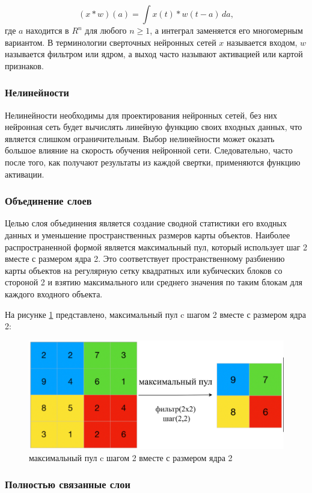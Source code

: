 \begin{equation}
    (x * w)(a) = \int x(t) * w (t - a) \, da
, \end{equation}
где \(a\) находится в \(R^{n}\) для любого \(n \ge 1\), а интеграл заменяется его многомерным вариантом. В терминологии сверточных нейронных сетей \(x\) называется входом, \(w\) называется фильтром или ядром, а выход часто называют активацией или картой признаков.

\subsubsection*{Нелинейности}

Нелинейности необходимы для проектирования нейронных сетей, без них нейронная сеть будет вычислять линейную функцию своих входных данных, что является слишком ограничительным. Выбор нелинейности может оказать большое влияние на скорость обучения нейронной сети. Следовательно, часто после того, как получают результаты из каждой свертки, применяются функцию активации.

\subsubsection*{Объединение слоев}

Целью слоя объединения является создание сводной статистики его входных данных и уменьшение пространственных размеров карты объектов. Наиболее распространенной формой является максимальный пул, который использует шаг 2 вместе с размером ядра 2. Это соответствует пространственному разбиению карты объектов на регулярную сетку квадратных или кубических блоков со стороной 2 и взятию максимального или среднего значения по таким блокам для каждого входного объекта.

На рисунке \ref{fig:max-pool} представлено, максимальный пул c шагом 2 вместе с размером ядра 2:
\begin{figure}[H]
	\centering
	\includegraphics[width=0.4\linewidth]{assets/max-pooling.png}
	\caption{максимальный пул c шагом 2 вместе с размером ядра 2}
	\label{fig:max-pool}
\end{figure}

\subsubsection*{Полностью связанные слои}

